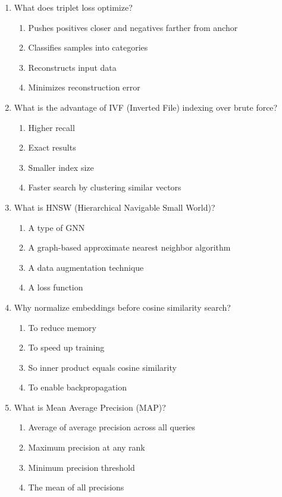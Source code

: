 \documentclass[12pt,a4paper]{article}
\begin{document}
\begin{enumerate}
\item What does triplet loss optimize?
\begin{enumerate}[label=\Alph*)]
    \item Pushes positives closer and negatives farther from anchor
    \item Classifies samples into categories
    \item Reconstructs input data
    \item Minimizes reconstruction error
\end{enumerate}

\item What is the advantage of IVF (Inverted File) indexing over brute force?
\begin{enumerate}[label=\Alph*)]
    \item Higher recall
    \item Exact results
    \item Smaller index size
    \item Faster search by clustering similar vectors
\end{enumerate}

\item What is HNSW (Hierarchical Navigable Small World)?
\begin{enumerate}[label=\Alph*)]
    \item A type of GNN
    \item A graph-based approximate nearest neighbor algorithm
    \item A data augmentation technique
    \item A loss function
\end{enumerate}

\item Why normalize embeddings before cosine similarity search?
\begin{enumerate}[label=\Alph*)]
    \item To reduce memory
    \item To speed up training
    \item So inner product equals cosine similarity
    \item To enable backpropagation
\end{enumerate}

\item What is Mean Average Precision (MAP)?
\begin{enumerate}[label=\Alph*)]
    \item Average of average precision across all queries
    \item Maximum precision at any rank
    \item Minimum precision threshold
    \item The mean of all precisions
\end{enumerate}


\end{enumerate}
\end{document}
